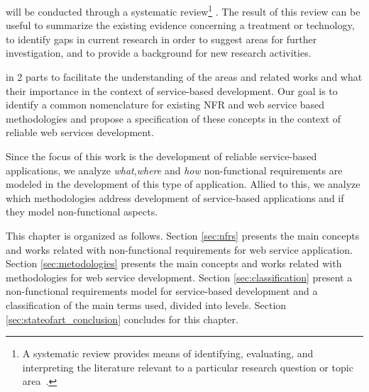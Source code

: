  
 
  will be conducted through a
 systematic review\footnote{A systematic review provides means of identifying, evaluating, and interpreting the literature relevant to a particular research
 question or topic area~\cite{Kitchenham08}.} \cite{Kitchenham08}.
 The result of this review can be useful to summarize the existing evidence
 concerning a treatment or technology, to identify gaps in current research in
 order to suggest areas for further investigation, and to provide a background
 for new research activities. 
 
  in 2 parts to facilitate the
 understanding of the areas and related works and what their importance in the context of
 service-based development.  Our goal is to identify a common nomenclature for existing NFR
 and web service based methodologies and propose a specification of these
 concepts in the context of reliable web services development. 
 
 Since the focus of this work is the development of reliable service-based
   applications, we analyze \textit{what},\textit{where} and \textit{how}
   non-functional requirements are modeled in the development of this type of application. Allied to this,
   we analyze which methodologies address development of service-based
   applications and if they model non-functional aspects.
 
 This chapter is organized as follows.  Section \ref{sec:nfrs}
 presents the main concepts and works related with non-functional requirements for web service application. Section \ref{sec:metodologies} presents the main concepts and works related with methodologies for web service development. Section \ref{sec:classification} present a non-functional requirements model for 
 service-based development and a classification of the main terms used, divided
 into levels. Section \ref{sec:stateofart_conclusion} concludes for this
 chapter.


